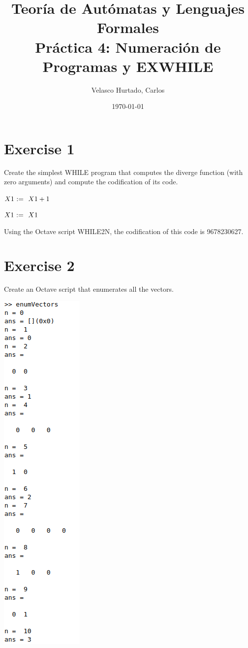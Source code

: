 \documentclass[11pt]{article}
\title{Teoría de Autómatas y Lenguajes Formales\\[.4\baselineskip]Práctica 4: Numeración de Programas y EXWHILE}
\author{Velasco Hurtado, Carlos}
\date{\today}
\begin{document}
\maketitle
\thispagestyle{empty}

\section{Exercise 1}
Create the simplest WHILE program that computes the diverge function (with zero arguments) and compute the codification of its code.
\\

\begin{whilecode}[H]

  $X1 \Assig X1 + 1$\;

 $X1 \Assig X1$

\end{whilecode}

Using the Octave script WHILE2N, the codification of this code is 9678230627.

\newpage

\section{Exercise 2}
Create an Octave script that enumerates all the vectors.

\includegraphics[scale=0.5]{enumVectors.png}
\newpage
\end{document}
